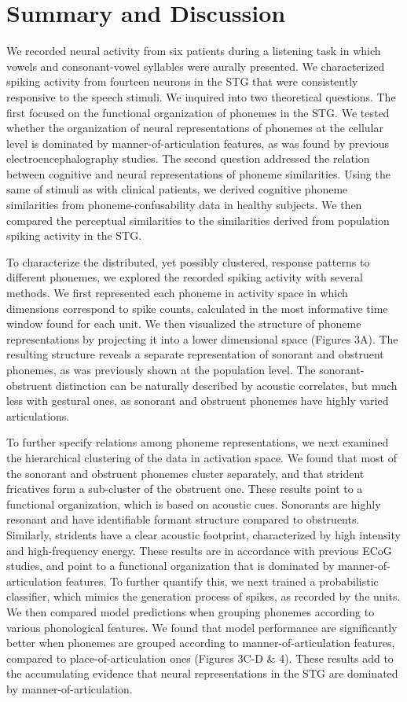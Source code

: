 \section{Summary and Discussion}
We recorded neural activity from six patients during a listening task in which vowels and consonant-vowel syllables were aurally presented. We characterized spiking activity from fourteen neurons in the STG that were consistently responsive to the speech stimuli. We inquired into two theoretical questions. The first focused on the functional organization of phonemes in the STG. We tested whether the organization of neural representations of phonemes at the cellular level is dominated by manner-of-articulation features, as was found by previous electroencephalography studies. The second question addressed the relation between cognitive and neural representations of phoneme similarities. Using the same of stimuli as with clinical patients, we derived cognitive phoneme similarities from phoneme-confusability data in healthy subjects. We then compared the perceptual similarities to the similarities derived from population spiking activity in the STG.

To characterize the distributed, yet possibly clustered, response patterns to different phonemes, we explored the recorded spiking activity with several methods. We first represented each phoneme in activity space in which dimensions correspond to spike counts, calculated in the most informative time window found for each unit. We then visualized the structure of phoneme representations by projecting it into a lower dimensional space (Figures 3A). The resulting structure reveals a separate representation of sonorant and obstruent phonemes, as was previously shown at the population level. The sonorant-obstruent distinction can be naturally described by acoustic correlates, but much less with gestural ones, as sonorant and obstruent phonemes have highly varied articulations.   

To further specify relations among phoneme representations, we next examined the hierarchical clustering of the data in activation space. We found that most of the sonorant and obstruent phonemes cluster separately, and that strident fricatives form a sub-cluster of the obstruent one. These results point to a functional organization, which is based on acoustic cues. Sonorants are highly resonant and have identifiable formant structure compared to obstruents. Similarly, stridents have a clear acoustic footprint, characterized by high intensity and high-frequency energy. These results are in accordance with previous ECoG studies, and point to a functional organization that is dominated by manner-of-articulation features. To further quantify this, we next trained a probabilistic classifier, which mimics the generation process of spikes, as recorded by the units. We then compared model predictions when grouping phonemes according to various phonological features. We found that model performance are significantly better when phonemes are grouped according to manner-of-articulation features, compared to place-of-articulation ones (Figures 3C-D \& 4). These results add to the accumulating evidence that neural representations in the STG are dominated by manner-of-articulation.

